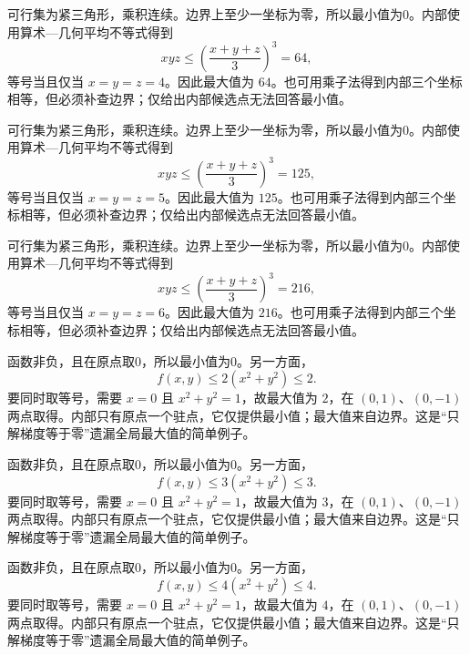 \documentclass[12pt,fontset=fandol]{ctexart}
\begin{document}
\begin{solve}\label{ans:c35q10}
可行集为紧三角形，乘积连续。边界上至少一坐标为零，所以最小值为0。内部使用算术—几何平均不等式得到
\[
xyz\le\left(\frac{x+y+z}3\right)^3=64,
\]
等号当且仅当 $x=y=z=4$。因此最大值为 $64$。也可用乘子法得到内部三个坐标相等，但必须补查边界；仅给出内部候选点无法回答最小值。
\end{solve}

\begin{solve}\label{ans:c35q11}
可行集为紧三角形，乘积连续。边界上至少一坐标为零，所以最小值为0。内部使用算术—几何平均不等式得到
\[
xyz\le\left(\frac{x+y+z}3\right)^3=125,
\]
等号当且仅当 $x=y=z=5$。因此最大值为 $125$。也可用乘子法得到内部三个坐标相等，但必须补查边界；仅给出内部候选点无法回答最小值。
\end{solve}

\begin{solve}\label{ans:c35q12}
可行集为紧三角形，乘积连续。边界上至少一坐标为零，所以最小值为0。内部使用算术—几何平均不等式得到
\[
xyz\le\left(\frac{x+y+z}3\right)^3=216,
\]
等号当且仅当 $x=y=z=6$。因此最大值为 $216$。也可用乘子法得到内部三个坐标相等，但必须补查边界；仅给出内部候选点无法回答最小值。
\end{solve}

\begin{solve}\label{ans:c35q13}
函数非负，且在原点取0，所以最小值为0。另一方面，
\[
f(x,y)\le 2(x^2+y^2)\le 2.
\]
要同时取等号，需要 $x=0$ 且 $x^2+y^2=1$，故最大值为 $2$，在 $(0,1)$、$(0,-1)$ 两点取得。内部只有原点一个驻点，它仅提供最小值；最大值来自边界。这是“只解梯度等于零”遗漏全局最大值的简单例子。
\end{solve}

\begin{solve}\label{ans:c35q14}
函数非负，且在原点取0，所以最小值为0。另一方面，
\[
f(x,y)\le 3(x^2+y^2)\le 3.
\]
要同时取等号，需要 $x=0$ 且 $x^2+y^2=1$，故最大值为 $3$，在 $(0,1)$、$(0,-1)$ 两点取得。内部只有原点一个驻点，它仅提供最小值；最大值来自边界。这是“只解梯度等于零”遗漏全局最大值的简单例子。
\end{solve}

\begin{solve}\label{ans:c35q15}
函数非负，且在原点取0，所以最小值为0。另一方面，
\[
f(x,y)\le 4(x^2+y^2)\le 4.
\]
要同时取等号，需要 $x=0$ 且 $x^2+y^2=1$，故最大值为 $4$，在 $(0,1)$、$(0,-1)$ 两点取得。内部只有原点一个驻点，它仅提供最小值；最大值来自边界。这是“只解梯度等于零”遗漏全局最大值的简单例子。
\end{solve}
\end{document}
